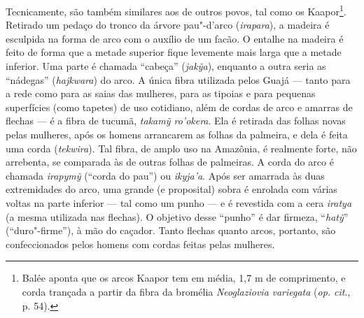Tecnicamente, são também similares aos de outros povos, tal como os
Kaapor\footnote{Balée aponta que os arcos Kaapor tem em média, 1,7 m de
  comprimento, e corda trançada a partir da fibra da bromélia
  \emph{Neoglaziovia} \emph{variegata} (\emph{op. cit}., p. 54).}. Retirado um
pedaço do tronco da árvore pau"-d'arco (\emph{irapara}), a madeira é
esculpida na forma de arco com o auxílio de um facão. O entalhe na
madeira é feito de forma que a metade superior fique levemente mais
larga que a metade inferior. Uma parte é chamada ``cabeça''
(\emph{jakỹa}), enquanto a outra seria as ``nádegas'' (\emph{hajkwara}) do
arco. A única fibra utilizada pelos Guajá --- tanto para a rede como para
as saias das mulheres, para as tipoias e para pequenas superfícies (como
tapetes) de uso cotidiano, além de cordas de arco e amarras de flechas ---
é a fibra de tucumã, \emph{takamỹ ro'okera}. Ela é retirada das folhas
novas pelas mulheres, após os homens arrancarem as folhas da palmeira, e
dela é feita uma corda (\emph{tekwira}). Tal fibra, de amplo uso na
Amazônia, é realmente forte, não arrebenta, se comparada às de outras
folhas de palmeiras. A corda do arco é chamada \emph{irapymỹ} (``corda do
pau'') ou \emph{ikyja'a}. Após ser amarrada às duas extremidades do arco,
uma grande (e proposital) sobra é enrolada com várias voltas na parte
inferior --- tal como um punho --- e é revestida com a cera \emph{iratya} (a
mesma utilizada nas flechas). O objetivo desse ``punho'' é dar firmeza,
``\emph{hatỹ}'' (``duro"-firme''), à mão do caçador. Tanto flechas quanto
arcos, portanto, são confeccionados pelos homens com cordas feitas pelas
mulheres.

